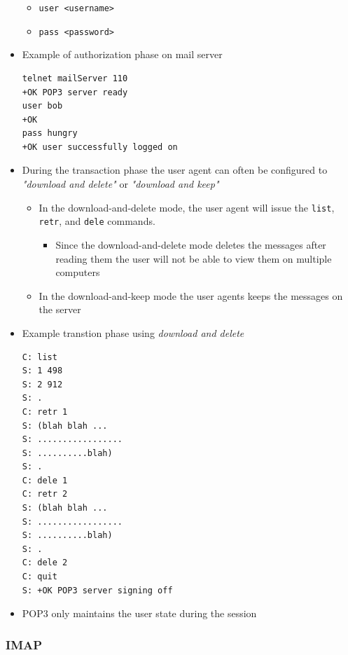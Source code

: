 \documentclass[11pt]{article}
\providecommand{\tightlist}{%
      \setlength{\itemsep}{0pt}\setlength{\parskip}{0pt}}
\begin{document}
\begin{itemize}
  \begin{itemize}
  \tightlist
  \item
    \texttt{user\ \textless{}username\textgreater{}}
  \item
    \texttt{pass\ \textless{}password\textgreater{}}
  \end{itemize}
\item
  Example of authorization phase on mail server

\begin{verbatim}
telnet mailServer 110
+OK POP3 server ready
user bob
+OK
pass hungry
+OK user successfully logged on
\end{verbatim}
\item
  During the transaction phase the user agent can often be configured to
  \emph{"download and delete"} or \emph{"download and keep"}

  \begin{itemize}
  \tightlist
  \item
    In the download-and-delete mode, the user agent will issue the
    \texttt{list}, \texttt{retr}, and \texttt{dele} commands.

    \begin{itemize}
    \tightlist
    \item
      Since the download-and-delete mode deletes the messages after
      reading them the user will not be able to view them on multiple
      computers
    \end{itemize}
  \item
    In the download-and-keep mode the user agents keeps the messages on
    the server
  \end{itemize}
\item
  Example transtion phase using \emph{download and delete}

\begin{verbatim}
C: list
S: 1 498
S: 2 912
S: .
C: retr 1
S: (blah blah ...
S: .................
S: ..........blah)
S: .
C: dele 1
C: retr 2
S: (blah blah ...
S: .................
S: ..........blah)
S: .
C: dele 2
C: quit
S: +OK POP3 server signing off
\end{verbatim}
\item
  POP3 only maintains the user state during the session
\end{itemize}

    \subsubsection{IMAP}\label{imap}
\end{document}
